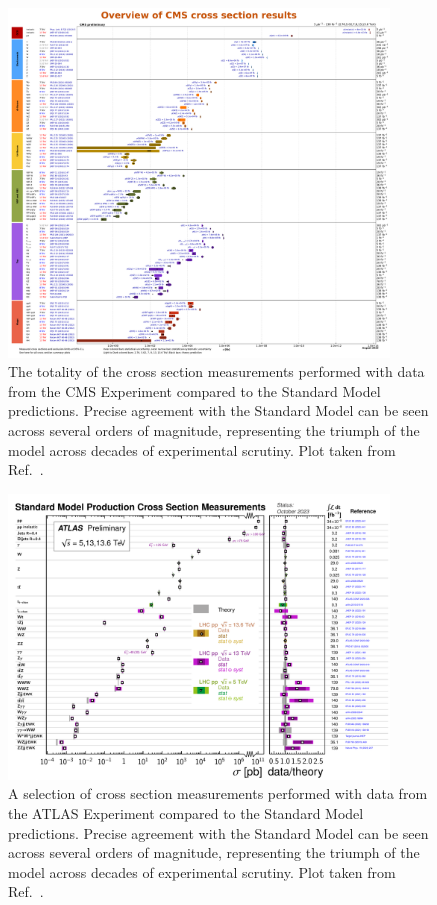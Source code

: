 \begin{figure}[htb]
    \centering
    \includegraphics[width=0.9\textwidth]{fig/cms/cms_xsecs_2023.pdf}
    \caption{
        The totality of the cross section measurements performed with data from the CMS Experiment compared to the Standard Model predictions. 
        Precise agreement with the Standard Model can be seen across several orders of magnitude, representing the triumph of the model across decades of experimental scrutiny. 
        Plot taken from Ref.~\cite{CMSXSecs}.
    }
    \label{fig:cms_xsecs}
\end{figure}

\begin{figure}[htb]
    \centering
    \includegraphics[width=0.9\textwidth]{fig/atlas/atlas_xsecs_2023.pdf}
    \caption{
        A selection of cross section measurements performed with data from the ATLAS Experiment compared to the Standard Model predictions. 
        Precise agreement with the Standard Model can be seen across several orders of magnitude, representing the triumph of the model across decades of experimental scrutiny. 
        Plot taken from Ref.~\cite{ATL-PHYS-PUB-2023-039}.
    }
    \label{fig:atlas_xsecs}
\end{figure}

